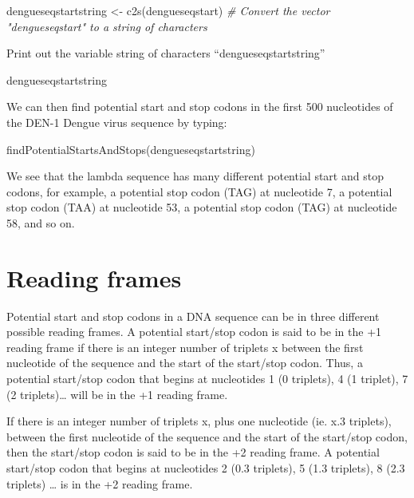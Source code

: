 \documentclass[
]{book}
\newenvironment{Shaded}{\begin{snugshade}}{\end{snugshade}}
\newcommand{\CommentTok}[1]{\textcolor[rgb]{0.56,0.35,0.01}{\textit{#1}}}
\newcommand{\FunctionTok}[1]{\textcolor[rgb]{0.00,0.00,0.00}{#1}}
\newcommand{\NormalTok}[1]{#1}
\newcommand{\OtherTok}[1]{\textcolor[rgb]{0.56,0.35,0.01}{#1}}
\begin{document}
\begin{Shaded}
\begin{Highlighting}[]
\NormalTok{dengueseqstartstring }\OtherTok{\textless{}{-}} \FunctionTok{c2s}\NormalTok{(dengueseqstart) }\CommentTok{\# Convert the vector "dengueseqstart" to a string of characters}
\end{Highlighting}
\end{Shaded}

Print out the variable string of characters ``dengueseqstartstring''

\begin{Shaded}
\begin{Highlighting}[]
\NormalTok{dengueseqstartstring                      }
\end{Highlighting}
\end{Shaded}

We can then find potential start and stop codons in the first 500 nucleotides of the DEN-1 Dengue virus sequence by typing:

\begin{Shaded}
\begin{Highlighting}[]
\FunctionTok{findPotentialStartsAndStops}\NormalTok{(dengueseqstartstring)}
\end{Highlighting}
\end{Shaded}

We see that the lambda sequence has many different potential start and stop codons, for example, a potential stop codon (TAG) at nucleotide 7, a potential stop codon (TAA) at nucleotide 53, a potential stop codon (TAG) at nucleotide 58, and so on.

\hypertarget{reading-frames}{%
\section{Reading frames}\label{reading-frames}}

Potential start and stop codons in a DNA sequence can be in three different possible reading frames. A potential start/stop codon is said to be in the +1 reading frame if there is an integer number of triplets x between the first nucleotide of the sequence and the start of the start/stop codon. Thus, a potential start/stop codon that begins at nucleotides 1 (0 triplets), 4 (1 triplet), 7 (2 triplets)\ldots{} will be in the +1 reading frame.

If there is an integer number of triplets x, plus one nucleotide (ie. x.3 triplets), between the first nucleotide of the sequence and the start of the start/stop codon, then the start/stop codon is said to be in the +2 reading frame. A potential start/stop codon that begins at nucleotides 2 (0.3 triplets), 5 (1.3 triplets), 8 (2.3 triplets) \ldots{} is in the +2 reading frame.
\end{document}
